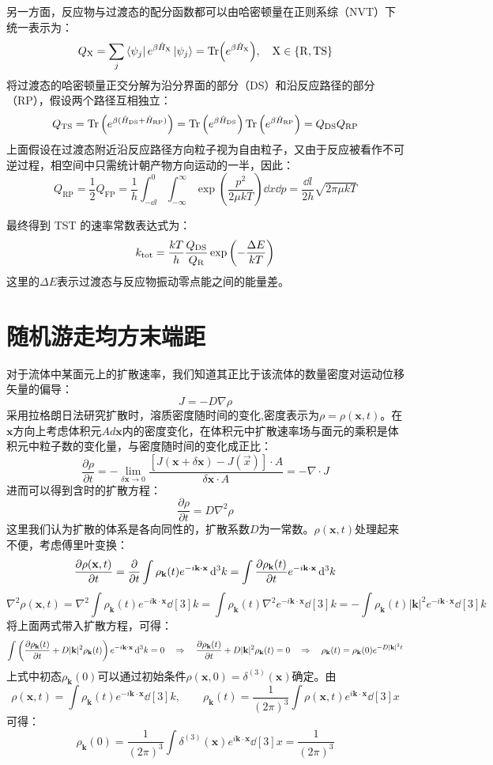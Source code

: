 另一方面，反应物与过渡态的配分函数都可以由哈密顿量在正则系综（NVT）下统一表示为：
\[Q_{\mathrm{X}} = \sum_j\bra{\psi_j}e^{\beta \hat{H}_{\mathrm{X}}}\ket{\psi_j}=\Tr(e^{\beta \hat{H}_{\mathrm{X}}}), \quad \mathrm{X}\in\{\mathrm{R},\mathrm{TS}\}\]
将过渡态的哈密顿量正交分解为沿分界面的部分（DS）和沿反应路径的部分（RP），假设两个路径互相独立：
\[Q_{\mathrm{TS}}=\Tr\left(e^{\beta (\hat{H}_{\mathrm{DS}}+\hat{H}_{\mathrm{RP}})}\right)=\Tr\left(e^{\beta \hat{H}_{\mathrm{DS}}}\right)\Tr\left(e^{\beta \hat{H}_{\mathrm{RP}}}\right)=Q_{\mathrm{DS}}Q_{\mathrm{RP}}\]
上面假设在过渡态附近沿反应路径方向粒子视为自由粒子，又由于反应被看作不可逆过程，相空间中只需统计朝产物方向运动的一半，因此：
\[Q_{\mathrm{RP}}=\frac{1}{2}Q_{\mathrm{FP}}=\frac{1}{h}\int_{-\dd l}^{0}\int_{-\infty}^{\infty}\exp\left(\frac{p^2}{2 \mu kT}\right)\dd x\dd p=\frac{\dd l}{2h}\sqrt{2 \pi \mu kT}\]

最终得到 TST 的速率常数表达式为：
\[k_{\rm tot}=\frac{kT}{h} \frac{Q_{\mathrm{DS}}}{Q_{\mathrm{R}}} \exp\left(-\frac{\Delta E}{kT}\right)\]
这里的$\Delta E$表示过渡态与反应物振动零点能之间的能量差。

\newpage
\section{随机游走均方末端距}
对于流体中某面元上的扩散速率，我们知道其正比于该流体的数量密度对运动位移矢量的偏导：
\[J=-D\nabla\rho\]
采用拉格朗日法研究扩散时，溶质密度随时间的变化,密度表示为$\rho=\rho(\mathbf{x},t)$。在$\mathbf{x}$方向上考虑体积元$Ad\mathbf{x}$内的密度变化，在体积元中扩散速率场与面元的乘积是体积元中粒子数的变化量，与密度随时间的变化成正比：
\[\frac{\partial \rho}{\partial t}=-\lim_{\delta \mathbf{x} \rightarrow 0} \frac{[J(\mathbf{x}+\delta\mathbf{x})-J(\vec{x})] \cdot A}{\delta \mathbf{x} \cdot A} =-\nabla \cdot J\]
进而可以得到含时的扩散方程：
\[\frac{\partial \rho}{\partial t}=D\nabla^2\rho\]
这里我们认为扩散的体系是各向同性的，扩散系数$D$为一常数。$\rho(\mathbf{x},t)$处理起来不便，考虑傅里叶变换：
\[\pdv{\rho(\mathbf{x},t)}{t}=\pdv{t}\int\rho_{\mathbf{k}}(t)e^{-i\mathbf{k}\cdot\mathbf{x}}\dd[3]{k}=\int\pdv{\rho_{\mathbf{k}}(t)}{t}e^{-i\mathbf{k}\cdot\mathbf{x}}\dd[3]{k}\]
\[\nabla^2\rho(\mathbf{x},t)=\nabla^2\int\rho_{\mathbf{k}}(t)e^{-i\mathbf{k}\cdot\mathbf{x}}\dd[3]{k}=\int\rho_{\mathbf{k}}(t)\nabla^2e^{-i\mathbf{k}\cdot\mathbf{x}}\dd[3]{k}=-\int\rho_{\mathbf{k}}(t)|\mathbf{k}|^2e^{-i\mathbf{k}\cdot\mathbf{x}}\dd[3]{k}\]
将上面两式带入扩散方程，可得：
\[\int\left(\pdv{\rho_{\mathbf{k}}(t)}{t}+D|\mathbf{k}|^2\rho_{\mathbf{k}}(t)\right)e^{-i\mathbf{k}\cdot\mathbf{x}}\dd[3]{k}=0 \quad \Rightarrow \quad \pdv{\rho_{\mathbf{k}}(t)}{t}+D|\mathbf{k}|^2\rho_{\mathbf{k}}(t)=0 \quad \Rightarrow \quad \rho_{\mathbf{k}}(t)=\rho_{\mathbf{k}}(0)e^{-D|\mathbf{k}|^2t}\]
上式中初态$\rho_{\mathbf{k}}(0)$可以通过初始条件$\rho(\mathbf{x},0)=\delta^{(3)}(\mathbf{x})$确定。由
\[\rho(\mathbf{x},t)=\int\rho_{\mathbf{k}}(t)e^{-i\mathbf{k}\cdot\mathbf{x}}\dd[3]{k},\qquad \rho_{\mathbf{k}}(t)=\frac{1}{(2\pi)^3}\int\rho(\mathbf{x},t)e^{i\mathbf{k}\cdot\mathbf{x}}\dd[3]{x}\]
可得：
\[\rho_{\mathbf{k}}(0)=\frac{1}{(2\pi)^3}\int\delta^{(3)}(\mathbf{x})e^{i\mathbf{k}\cdot\mathbf{x}}\dd[3]{x}=\frac{1}{(2\pi)^3}\]

